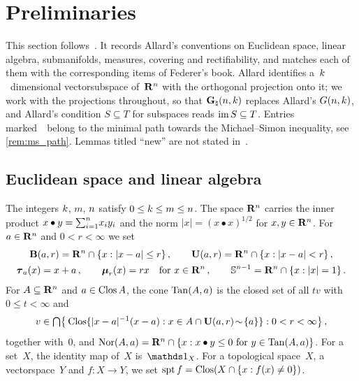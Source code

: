 
\section{Preliminaries}
\label{sec:prelim}

\begin{miniremark}
    \label{mr:sec2}
    This section follows~\cite[section~2]{Allard1972}. It records Allard's conventions on
    Euclidean space, linear algebra, submanifolds, measures, covering and rectifiability, and
    matches each of them with the corresponding items of Federer's book. Allard identifies
    a~$k$~dimensional vectorsubspace of~$\mathbf{R}^{n}$ with the orthogonal projection onto it;
    we work with the projections throughout, so that $\mathbf{G}_{\natural}(n,k)$ replaces Allard's
    $G(n,k)$, and Allard's condition $S \subseteq T$ for subspaces reads $\operatorname{im} S \subseteq
    T$. Entries marked~\MS\ belong to the minimal path towards the Michael--Simon inequality, see
    \ref{rem:ms_path}. Lemmas titled ``new'' are not stated in~\cite{Allard1972}.
\end{miniremark}

\subsection{Euclidean space and linear algebra}

\begin{definition}
    \label{al:2.1}
    The integers $k$, $m$, $n$ satisfy $0 \le k \le m \le n$. The space
    $\mathbf{R}^{n}$ carries the inner product $x \bullet y = {\textstyle\sum_{i=1}^{n}} x_i y_i$ and the
    norm $|x| = (x \bullet x)^{1/2}$ for $x, y \in \mathbf{R}^{n}$. For $a \in \mathbf{R}^{n}$ and $0 < r
    < \infty$ we set
    \begin{gather*}
        \mathbf{B}(a,r) = \mathbf{R}^{n} \cap \{ x : |x-a| \le r \} \,, \qquad
        \mathbf{U}(a,r) = \mathbf{R}^{n} \cap \{ x : |x-a| < r \} \,, \\
        \boldsymbol{\tau}_{a}(x) = x + a \,, \qquad \boldsymbol{\mu}_{r}(x) = r x \quad \text{for $x \in \mathbf{R}^{n}$} \,,
        \qquad \mathbb{S}^{n-1} = \mathbf{R}^{n} \cap \{ x : |x| = 1 \} \,.
    \end{gather*}
    For $A \subseteq \mathbf{R}^{n}$ and $a \in \mathop{\mathrm{Clos}}A$, the cone $\operatorname{Tan}(A,a)$ is the closed set of
    all $t v$ with $0 \le t < \infty$ and
    \begin{displaymath}
        v \in {{\textstyle \bigcap}} \big\{ \mathop{\mathrm{Clos}}\{ |x-a|^{-1}(x-a) : x \in A \cap \mathbf{U}(a,r) \!\sim\! \{a\}
        \} : 0 < r < \infty \big\} \,,
    \end{displaymath}
    together with~$0$, and $\operatorname{Nor}(A,a) = \mathbf{R}^{n} \cap \{ x : x \bullet y \le 0 \text{ for } y
    \in \operatorname{Tan}(A,a) \}$. For a set~$X$, the identity map of~$X$ is~$\id{X}$. For a topological
    space~$X$, a vectorspace~$Y$ and $f : X \to Y$, we set $\operatorname{spt} f = \mathop{\mathrm{Clos}}(X \cap \{ x : f(x)
    \ne 0 \})$.
\end{definition}

